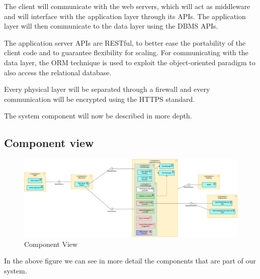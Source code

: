 \documentclass{article}
\begin{document}
    The client will communicate with the web servers, which will act as middleware and will interface with the application layer through its APIs. The application layer will then communicate to the data layer using the DBMS APIs. \par

    The application server APIs are RESTful, to better ease the portability of the client code and to guarantee flexibility for scaling. For communicating with the data layer, the ORM technique is used to exploit the object-oriented paradigm to also access the relational database. \par

    Every physical layer will be separated through a firewall and every communication will be encrypted using the HTTPS standard. \par

    The system component will now be described in more depth.
    

\newpage

\subsection{Component view}

    \begin{figure} [h]
        \centering
        \includegraphics[width=1\textwidth]{images/ArchitecturalDesign/ComponentView.png}
        \caption{\label{fig:ComponentView}Component View}
    \end{figure}
    
    In the above figure we can see in more detail the components that are part of our system. \par
    
\end{document}
